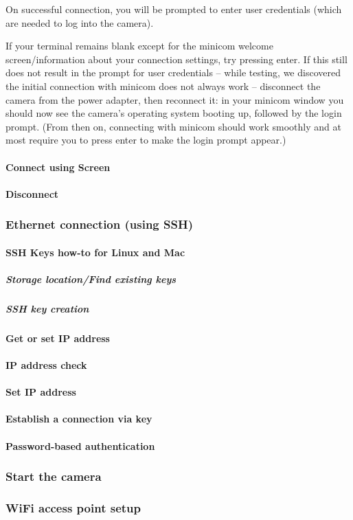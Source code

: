 On successful connection, you will be prompted to enter user credentials (which are needed to log into the camera).

If your terminal remains blank except for the minicom welcome screen/information about your connection settings, try pressing enter. If this still does not result in the prompt for user credentials – while testing, we discovered the initial connection with minicom does not always work – disconnect the camera from the power adapter, then reconnect it: in your minicom window you should now see the camera's operating system booting up, followed by the login prompt. (From then on, connecting with minicom should work smoothly and at most require you to press enter to make the login prompt appear.)

\paragraph{Connect using Screen}
\paragraph{Disconnect}
\subsubsection{Ethernet connection (using SSH)}
\paragraph{SSH Keys how-to for Linux and Mac}
\subparagraph{Storage location/Find existing keys}
\subparagraph{SSH key creation}
\paragraph{Get or set IP address}
\paragraph{IP address check}
\paragraph{Set IP address}
\paragraph{Establish a connection via key}
\paragraph{Password-based authentication}
\subsubsection{Start the camera}
\subsubsection{WiFi access point setup}